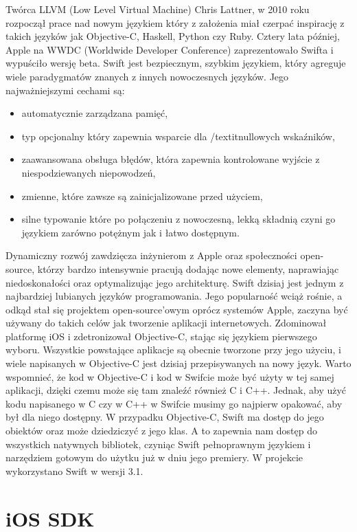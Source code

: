 Twórca LLVM (Low Level Virtual Machine) Chris Lattner, w 2010 roku rozpoczął prace nad nowym językiem który z założenia miał czerpać inspirację z takich języków jak Objective-C, Haskell, Python czy Ruby. Cztery lata później, Apple na WWDC (Worldwide Developer Conference) zaprezentowało Swifta i wypuściło wersję beta. Swift jest bezpiecznym, szybkim językiem, który agreguje wiele paradygmatów znanych z innych nowoczesnych języków. Jego najważniejszymi cechami są:
\begin{itemize}
    \item automatycznie zarządzana pamięć,
    \item typ opcjonalny który zapewnia wsparcie dla /textit{nullowych} wskaźników,
    \item zaawansowana obsługa błędów, która zapewnia kontrolowane wyjście z niespodziewanych niepowodzeń,
    \item zmienne, które zawsze są zainicjalizowane przed użyciem,
    \item silne typowanie które po połączeniu z nowoczesną, lekką składnią czyni go językiem zarówno potężnym jak i łatwo dostępnym.
\end{itemize}
Dynamiczny rozwój zawdzięcza inżynierom z Apple oraz społeczności open-source, którzy bardzo intensywnie pracują dodając nowe elementy, naprawiając niedoskonałości oraz optymalizując jego architekturę. Swift dzisiaj jest jednym z najbardziej lubianych języków programowania. Jego popularność wciąż rośnie, a odkąd stał się projektem open-source'owym oprócz systemów Apple, zaczyna być używany do takich celów jak tworzenie aplikacji internetowych. Zdominował platformę iOS i zdetronizował Objective-C, stając się językiem pierwszego wyboru. Wszystkie powstające aplikacje są obecnie tworzone przy jego użyciu, i wiele napisanych w Objective-C jest dzisiaj przepisywanych na nowy język. Warto wspomnieć, że kod w Objective-C i kod w Swifcie może być użyty w tej samej aplikacji, dzięki czemu może się tam znaleźć również C i C++. Jednak, aby użyć kodu napisanego w C czy w C++ w Swifcie musimy go najpierw opakować, aby był dla niego dostępny. W przypadku Objective-C, Swift ma dostęp do jego obiektów oraz może dziedziczyć z jego klas. A to zapewnia nam dostęp do wszystkich natywnych bibliotek, czyniąc Swift pełnoprawnym językiem i narzędziem gotowym do użytku już w dniu jego premiery. W projekcie wykorzystano Swift w wersji 3.1.

\section{iOS SDK}

